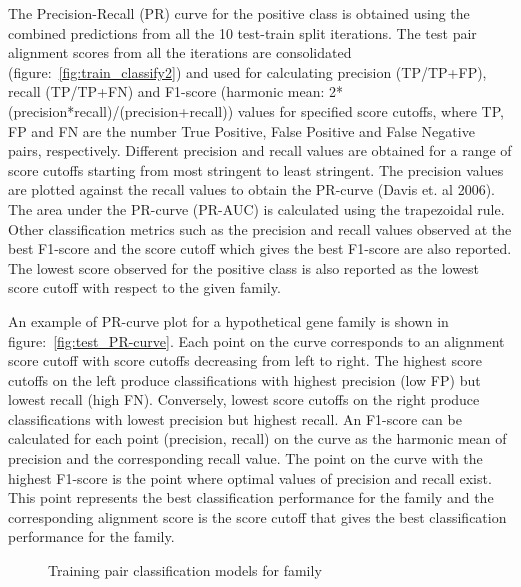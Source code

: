 \documentclass{article}
\begin{document}
			The Precision-Recall (PR) curve for the positive class is obtained using the combined predictions from all the 10 test-train split iterations. The test pair alignment scores from all the iterations are consolidated (figure:~\ref{fig:train_classify2}) and used for calculating precision (TP/TP+FP), recall (TP/TP+FN) and F1-score (harmonic mean: 2*(precision*recall)/(precision+recall)) values for specified score cutoffs, where TP, FP and FN are the number True Positive, False Positive and False Negative pairs, respectively. Different precision and recall values are obtained for a range of score cutoffs starting from most stringent to least stringent. The precision values are plotted against the recall values to obtain the PR-curve (Davis et. al 2006). The area under the PR-curve (PR-AUC) is calculated using the trapezoidal rule. Other classification metrics such as the precision and recall values observed at the best F1-score and the score cutoff which gives the best F1-score are also reported. The lowest score observed for the positive class is also reported as the lowest score cutoff with respect to the given family. 
			
			An example of PR-curve plot for a hypothetical gene family is shown in figure:~\ref{fig:test_PR-curve}. Each point on the curve corresponds to an alignment score cutoff with score cutoffs decreasing from left to right. The highest score cutoffs on the left produce classifications with highest precision (low FP) but lowest recall (high FN). Conversely, lowest score cutoffs on the right produce classifications with lowest precision but highest recall. An F1-score can be calculated for each point (precision, recall) on the curve as the harmonic mean of precision and the corresponding recall value. The point on the curve with the highest F1-score is the point where optimal values of precision and recall exist. This point represents the best classification performance for the family and the corresponding alignment score is the score cutoff that gives the best classification performance for the family.
			
			\begin{figure}
				\caption{Training pair classification models for family}
				\label{fig:train_classify1}
			\end{figure}
			
\end{document}
